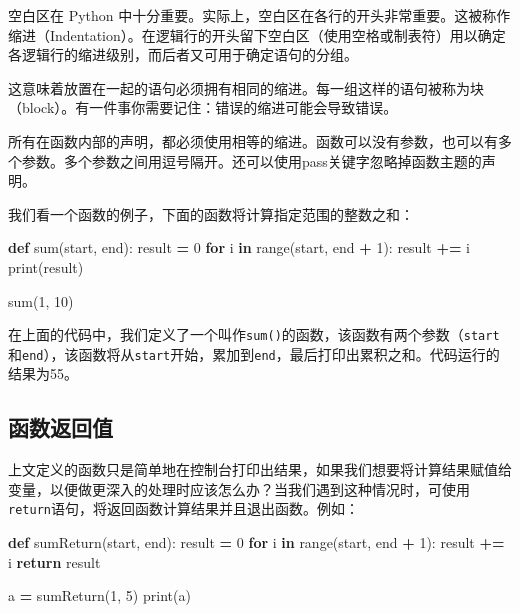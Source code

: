 \documentclass[]{ctexbook}
\newenvironment{Shaded}{\begin{snugshade}}{\end{snugshade}}
\newcommand{\BuiltInTok}[1]{#1}
\newcommand{\ControlFlowTok}[1]{\textcolor[rgb]{0.13,0.29,0.53}{\textbf{#1}}}
\newcommand{\DecValTok}[1]{\textcolor[rgb]{0.00,0.00,0.81}{#1}}
\newcommand{\KeywordTok}[1]{\textcolor[rgb]{0.13,0.29,0.53}{\textbf{#1}}}
\newcommand{\NormalTok}[1]{#1}
\newcommand{\OperatorTok}[1]{\textcolor[rgb]{0.81,0.36,0.00}{\textbf{#1}}}
\begin{document}
空白区在 Python 中十分重要。实际上，空白区在各行的开头非常重要。这被称作缩进（Indentation）。在逻辑行的开头留下空白区（使用空格或制表符）用以确定各逻辑行的缩进级别，而后者又可用于确定语句的分组。

这意味着放置在一起的语句必须拥有相同的缩进。每一组这样的语句被称为块（block）。有一件事你需要记住：错误的缩进可能会导致错误。

所有在函数内部的声明，都必须使用相等的缩进。函数可以没有参数，也可以有多个参数。多个参数之间用逗号隔开。还可以使用pass关键字忽略掉函数主题的声明。

我们看一个函数的例子，下面的函数将计算指定范围的整数之和：

\begin{Shaded}
\begin{Highlighting}[]
\KeywordTok{def} \BuiltInTok{sum}\NormalTok{(start, end):}
\NormalTok{    result }\OperatorTok{=} \DecValTok{0}
    \ControlFlowTok{for}\NormalTok{ i }\KeywordTok{in} \BuiltInTok{range}\NormalTok{(start, end }\OperatorTok{+} \DecValTok{1}\NormalTok{):}
\NormalTok{        result }\OperatorTok{+=}\NormalTok{ i}
    \BuiltInTok{print}\NormalTok{(result)}

\BuiltInTok{sum}\NormalTok{(}\DecValTok{1}\NormalTok{, }\DecValTok{10}\NormalTok{)}
\end{Highlighting}
\end{Shaded}

在上面的代码中，我们定义了一个叫作\texttt{sum()}的函数，该函数有两个参数（\texttt{start}和\texttt{end}），该函数将从\texttt{start}开始，累加到\texttt{end}，最后打印出累积之和。代码运行的结果为55。

\hypertarget{ux51fdux6570ux8fd4ux56deux503c}{%
\subsection{函数返回值}\label{ux51fdux6570ux8fd4ux56deux503c}}

上文定义的函数只是简单地在控制台打印出结果，如果我们想要将计算结果赋值给变量，以便做更深入的处理时应该怎么办？当我们遇到这种情况时，可使用\texttt{return}语句，将返回函数计算结果并且退出函数。例如：

\begin{Shaded}
\begin{Highlighting}[]
\KeywordTok{def}\NormalTok{ sumReturn(start, end):}
\NormalTok{    result }\OperatorTok{=} \DecValTok{0}
    \ControlFlowTok{for}\NormalTok{ i }\KeywordTok{in} \BuiltInTok{range}\NormalTok{(start, end }\OperatorTok{+} \DecValTok{1}\NormalTok{):}
\NormalTok{        result }\OperatorTok{+=}\NormalTok{ i}
    \ControlFlowTok{return}\NormalTok{ result}

\NormalTok{a }\OperatorTok{=}\NormalTok{ sumReturn(}\DecValTok{1}\NormalTok{, }\DecValTok{5}\NormalTok{)}
\BuiltInTok{print}\NormalTok{(a)}
\end{Highlighting}
\end{Shaded}
\end{document}

